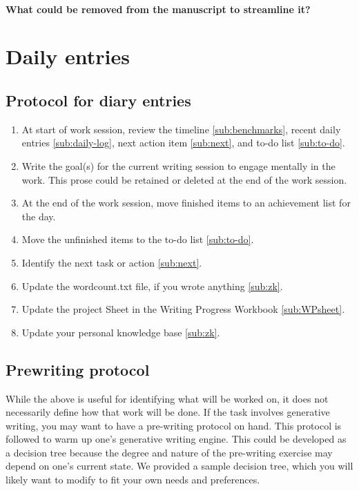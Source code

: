 \documentclass[10pt,letterpaper]{article}
\newcommand{\be}{\begin{enumerate}}
\newcommand{\ee}{\end{enumerate}}
\begin{document}
\begin{description}
\paragraph{What could be removed from the manuscript to streamline it?}




\section{Daily entries}
\label{sec:dailyEntries}

\subsection{Protocol for diary entries}
\label{sub:daily-protocol}

\be
\item At start of work session, review the timeline \ref{sub:benchmarks}, recent daily entries \ref{sub:daily-log}, next action item \ref{sub:next}, and to-do list \ref{sub:to-do}.
\item Write the goal(s) for the current writing session to engage mentally in the work. This prose could be retained or deleted at the end of the work session.
\item At the end of the work session, move finished items to an achievement list for the day.
\item Move the unfinished items to the to-do list \ref{sub:to-do}.
\item Identify the next task or action \ref{sub:next}.
\item Update the wordcount.txt file, if you wrote anything \ref{sub:zk}.
\item Update the project Sheet in the Writing Progress Workbook \ref{sub:WPsheet}.
\item Update your personal knowledge base \ref{sub:zk}.
\ee


\subsection{Prewriting protocol}
\label{sub:prewritng-protocol}

While the above is useful for identifying what will be worked on, it does not necessarily define how that work will be done.
If the task involves generative writing, you may want to have a pre-writing protocol on hand.
This protocol is followed to warm up one's generative writing engine.
This could be developed as a decision tree because the degree and nature of the pre-writing exercise may depend on one's current state.
We provided a sample decision tree, which you will likely want to modify to fit your own needs and preferences.




\end{description}
\end{document}
